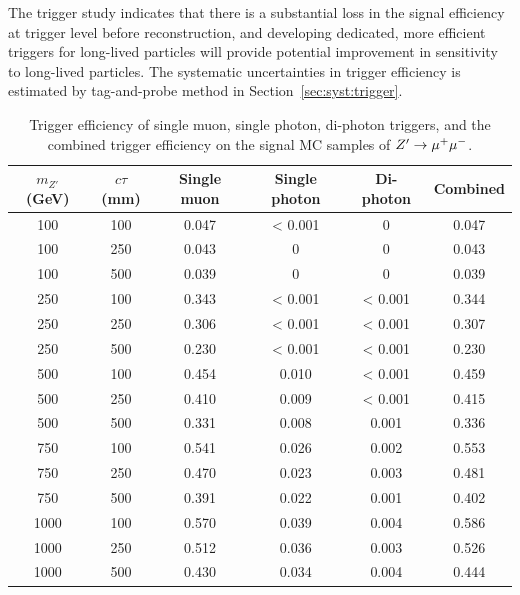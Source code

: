 The trigger study indicates that there is a substantial loss in the signal efficiency at trigger level before reconstruction, and developing dedicated, more efficient triggers for long-lived particles will provide potential improvement in sensitivity to long-lived particles. The systematic uncertainties in trigger efficiency is estimated by tag-and-probe method in Section~\ref{sec:syst:trigger}.

\begin{table}[!htb]
  \centering
  \begin{tabular}{ c c | c c c c}
    \hline
    \hline
    $m_{Z'}$ (GeV) & $c\tau$ (mm) & Single muon & Single photon & Di-photon & Combined \\
    \hline
    100			&	100	& 0.047 	& < 0.001   &0  	    &0.047  		\\
    100			&	250	& 0.043  	&0  	 	&0  	    &0.043  		\\
    100			&	500	& 0.039 	&0  	 	&0  	    &0.039  		\\
    250			&	100	& 0.343  	&< 0.001 	&< 0.001    &0.344  		\\
    250			&	250	& 0.306  	&< 0.001 	&< 0.001    &0.307  		\\
    250			&	500	& 0.230 	&< 0.001 	&< 0.001    &0.230  		\\
    500			&	100	& 0.454 	&0.010   	&< 0.001    &0.459  		\\
    500			&	250	& 0.410 	&0.009   	&< 0.001    &0.415  		\\
    500			&	500	& 0.331  	&0.008   	&0.001      &0.336  		\\
    750			&	100	& 0.541 	&0.026   	&0.002      &0.553  		\\
    750			&	250	& 0.470 	&0.023   	&0.003      &0.481  		\\
    750			&	500	& 0.391 	&0.022 	    &0.001      &0.402  		\\
    1000	    &	100	& 0.570   	&0.039   	&0.004      &0.586  		\\
    1000	    &	250	& 0.512   	&0.036   	&0.003      &0.526  		\\
    1000	    &	500	& 0.430   	&0.034 	    &0.004      &0.444  		\\
    \hline
    \hline
  \end{tabular}
  \caption{Trigger efficiency of single muon, single photon, di-photon triggers, and the combined trigger efficiency on the signal MC samples of $Z'\rightarrow\mu^{+}\mu^{-}$.}
  \label{table:m_trig_eff_mumu}
\end{table}

